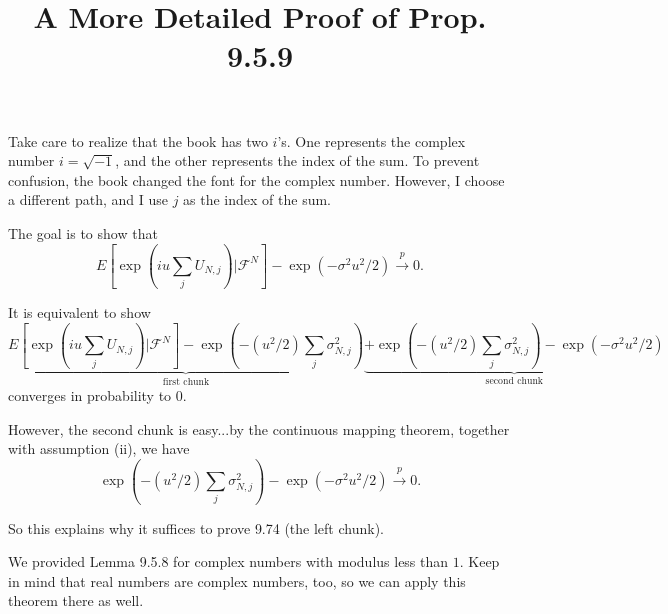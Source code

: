 \documentclass{article}
\title{A More Detailed Proof of Prop. 9.5.9}
\begin{document}
\maketitle

Take care to realize that the book has two $i$'s. One represents the complex number $i = \sqrt{-1}$, and the other represents the index of the sum. To prevent confusion, the book changed the font for the complex number. However, I choose a different path, and I use $j$ as the index of the sum. 
\newline

The goal is to show that 
\[
E\left[ \exp\left( i u \sum_j U_{N,j} \right) \bigg\rvert \mathcal{F}^N \right] - \exp(- \sigma^2 u^2/2) \overset{p}{\to} 0.
\]

It is equivalent to show
\[
\underbrace{
E\left[ \exp\left( i u \sum_j U_{N,j} \right) \bigg\rvert \mathcal{F}^N \right] 
- \exp\left( -(u^2/2) \sum_j \sigma^2_{N,j}  \right)}_{\text{first chunk}}
\underbrace{
+ \exp\left( -(u^2/2) \sum_j \sigma^2_{N,j}  \right)
- \exp(- \sigma^2 u^2/2)}_{\text{second chunk}} 
\]
converges in probability to $0$. 

However, the second chunk is easy...by the continuous mapping theorem, together with assumption (ii), we have
\[
\exp\left( -(u^2/2) \sum_j \sigma^2_{N,j}  \right) - \exp(- \sigma^2 u^2/2)\overset{p}{\to} 0.
\]

So this explains why it suffices to prove 9.74 (the left chunk).

We provided Lemma 9.5.8 for complex numbers with modulus less than $1$. Keep in mind that real numbers are complex numbers, too, so we can apply this theorem there as well.
\end{document}
